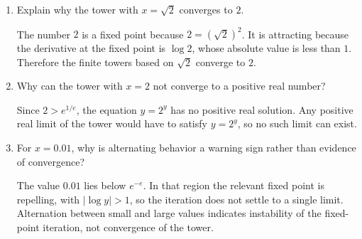 \documentclass{essay}
\begin{document}
\begin{enumerate}
  \item Explain why the tower with \(x=\sqrt2\) converges to \(2\).
    \begin{answer}
      The number \(2\) is a fixed point because
      \(2=(\sqrt2)^2\). It is attracting because the derivative at the fixed
      point is \(\log 2\), whose absolute value is less than \(1\). Therefore
      the finite towers based on \(\sqrt2\) converge to \(2\).
    \end{answer}

  \item Why can the tower with \(x=2\) not converge to a positive real number?
    \begin{answer}
      Since \(2>e^{1/e}\), the equation \(y=2^y\) has no positive real
      solution. Any positive real limit of the tower would have to satisfy
      \(y=2^y\), so no such limit can exist.
    \end{answer}

  \item For \(x=0.01\), why is alternating behavior a warning sign rather than
    evidence of convergence?
    \begin{answer}
      The value \(0.01\) lies below \(e^{-e}\). In that region the relevant
      fixed point is repelling, with \(|\log y|>1\), so the iteration does not
      settle to a single limit. Alternation between small and large values
      indicates instability of the fixed-point iteration, not convergence of
      the tower.
    \end{answer}
\end{enumerate}
\end{document}
